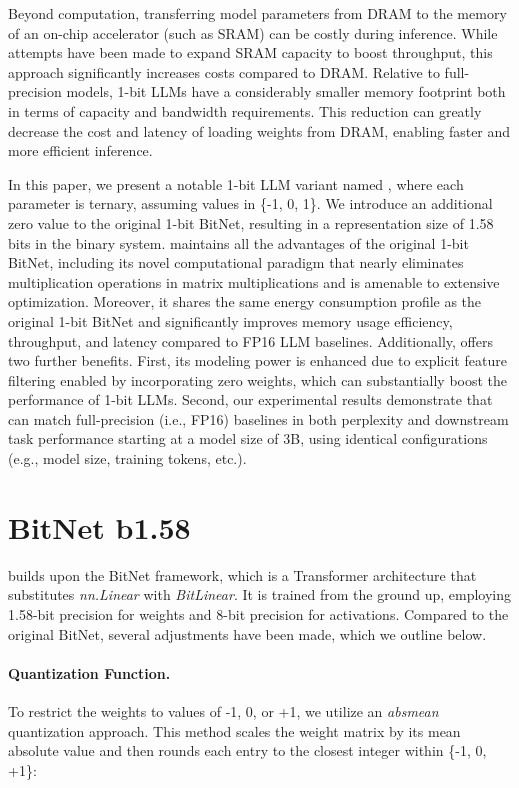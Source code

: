 Beyond computation, transferring model parameters from DRAM to the memory of an on-chip accelerator (such as SRAM) can be costly during inference. While attempts have been made to expand SRAM capacity to boost throughput, this approach significantly increases costs compared to DRAM. Relative to full-precision models, 1-bit LLMs have a considerably smaller memory footprint both in terms of capacity and bandwidth requirements. This reduction can greatly decrease the cost and latency of loading weights from DRAM, enabling faster and more efficient inference.

In this paper, we present a notable 1-bit LLM variant named \textbf{}, where each parameter is ternary, assuming values in \{-1, 0, 1\}. We introduce an additional zero value to the original 1-bit BitNet, resulting in a representation size of 1.58 bits in the binary system.  maintains all the advantages of the original 1-bit BitNet, including its novel computational paradigm that nearly eliminates multiplication operations in matrix multiplications and is amenable to extensive optimization. Moreover, it shares the same energy consumption profile as the original 1-bit BitNet and significantly improves memory usage efficiency, throughput, and latency compared to FP16 LLM baselines. Additionally,  offers two further benefits. First, its modeling power is enhanced due to explicit feature filtering enabled by incorporating zero weights, which can substantially boost the performance of 1-bit LLMs. Second, our experimental results demonstrate that  can match full-precision (i.e., FP16) baselines in both perplexity and downstream task performance starting at a model size of 3B, using identical configurations (e.g., model size, training tokens, etc.).

\section{BitNet b1.58}

 builds upon the BitNet framework, which is a Transformer architecture that substitutes \emph{nn.Linear} with \emph{BitLinear}. It is trained from the ground up, employing 1.58-bit precision for weights and 8-bit precision for activations. Compared to the original BitNet, several adjustments have been made, which we outline below.

\paragraph{Quantization Function.} To restrict the weights to values of -1, 0, or +1, we utilize an \emph{absmean} quantization approach. This method scales the weight matrix by its mean absolute value and then rounds each entry to the closest integer within \{-1, 0, +1\}:

